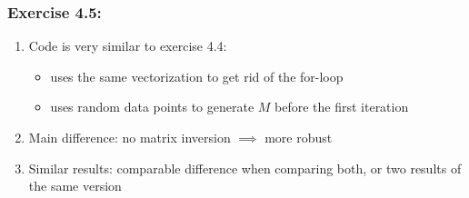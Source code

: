 \documentclass[10pt,aspectratio=169,handout]{beamer}
\begin{document}
\begin{frame}
    \frametitle{Exercise 4.5: }

    \begin{enumerate}
        \item Code is very similar to exercise 4.4:
        \begin{itemize}
            \item uses the same vectorization to get rid of the for-loop
            \item uses random data points to generate $M$ before the first iteration 
        \end{itemize}
        \item Main difference: no matrix inversion $\implies$ more robust
        \item Similar results: comparable difference when comparing both, or two results of the same version 
    \end{enumerate}
    

\end{frame}
\end{document}
